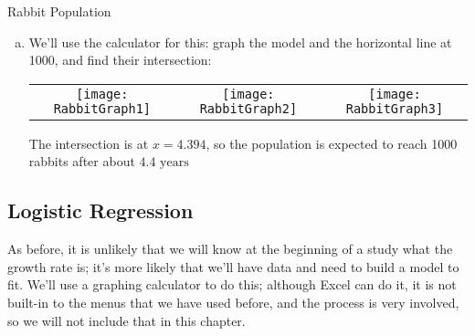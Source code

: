 \begin{example}[https://www.youtube.com/watch?v=mmL2H7_ynUA]{Rabbit Population}
\begin{enumerate}[(a)]
\item We'll use the calculator for this: graph the model and the horizontal line at 1000, and find their intersection:
\begin{center}
\begin{tabular}{c c c}
\texttt{[image: RabbitGraph1]}
& \texttt{[image: RabbitGraph2]}
& \texttt{[image: RabbitGraph3]}
\end{tabular}
\end{center}

The intersection is at $x=4.394$, so the population is expected to reach 1000 rabbits after about $\boxed{4.4 \textrm{ years}}$
\end{enumerate}
\end{example}
\pagebreak

\subsection{Logistic Regression}
As before, it is unlikely that we will know at the beginning of a study what the growth rate is; it's more likely that we'll have data and need to build a model to fit.  We'll use a graphing calculator to do this; although Excel can do it, it is not built-in to the menus that we have used before, and the process is very involved, so we will not include that in this chapter.

